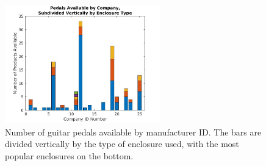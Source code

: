 \documentclass{article}
\begin{document}
	\begin{figure}
		\centering
		\includegraphics[width = 0.6\textwidth]{PR4Images/PedalsAvailable.jpg}
		\caption{Number of guitar pedals available by manufacturer ID.  The bars are divided vertically by the type of enclosure used, with the most popular enclosures on the bottom.}
		\label{fig:pedalsAvailable}
	\end{figure}
\end{document}

